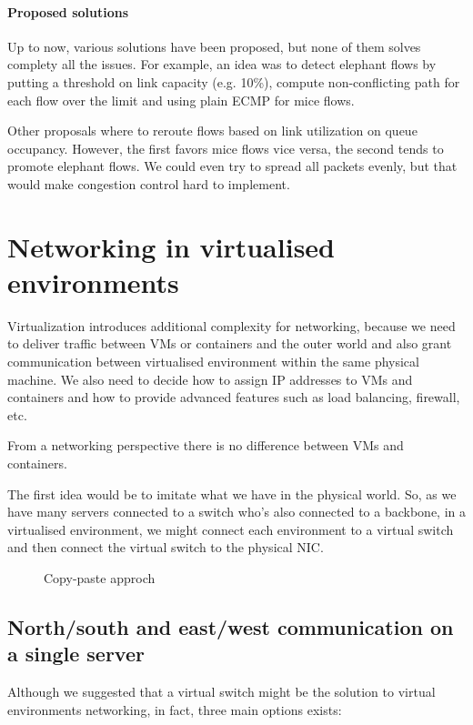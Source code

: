 \paragraph{Proposed solutions}
Up to now, various solutions have been proposed, but none of them solves complety
all the issues. For example, an idea was to detect elephant flows by putting
a threshold on link capacity (e.g. 10\%), compute non-conflicting path for
each flow over the limit and using plain ECMP for mice flows.

Other proposals where to reroute flows based on link utilization on queue
occupancy. However, the first favors mice flows vice versa, the second tends to
promote elephant flows. We could even try to spread all packets evenly, but that
would make congestion control hard to implement.

\section{Networking in virtualised environments}
Virtualization introduces additional complexity for networking, because we need
to deliver traffic between VMs or containers and the outer world and also grant
communication between virtualised environment within the same physical machine.
We also need to decide how to assign IP addresses to VMs and containers and
how to provide advanced features such as load balancing, firewall, etc.

\begin{note}
    From a networking perspective there is no difference between VMs and
    containers.
\end{note}

\noindent
The first idea would be to imitate what we have in the physical world. So, as
we have many servers connected to a switch who's also connected to a backbone,
in a virtualised environment, we might connect each environment to a virtual
switch and then connect the virtual switch to the physical NIC.

\begin{figure}[h!]
    \centering
    \hspace{1.5cm}
    \caption{Copy-paste approch}
\end{figure}

\subsection{North/south and east/west communication on a single server}
Although we suggested that a virtual switch might be the solution to virtual
environments networking, in fact, three main options exists:

